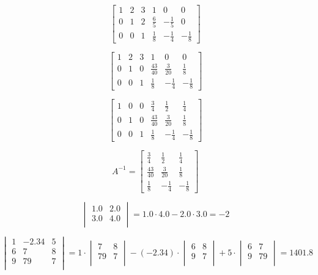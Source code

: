 \documentclass[a4paper, 14pt]{article}
\begin{document}
\[
\begin{bmatrix}
1 & 2 & 3 & 1 & 0 & 0 \\
0 & 1 & 2 & \frac{6}{5} & -\frac{1}{5} & 0 \\
0 & 0 & 1 & \frac{1}{8} & -\frac{1}{4} & -\frac{1}{8}
\end{bmatrix}
\]

\[
\begin{bmatrix}
1 & 2 & 3 & 1 & 0 & 0 \\
0 & 1 & 0 & \frac{43}{40} & \frac{3}{20} & \frac{1}{8} \\
0 & 0 & 1 & \frac{1}{8} & -\frac{1}{4} & -\frac{1}{8}
\end{bmatrix}
\]

\[
\begin{bmatrix}
1 & 0 & 0 & \frac{3}{4} & \frac{1}{2} & \frac{1}{4} \\
0 & 1 & 0 & \frac{43}{40} & \frac{3}{20} & \frac{1}{8} \\
0 & 0 & 1 & \frac{1}{8} & -\frac{1}{4} & -\frac{1}{8}
\end{bmatrix}
\]

\[
A^{-1} = \begin{bmatrix}
\frac{3}{4} & \frac{1}{2} & \frac{1}{4} \\
\frac{43}{40} & \frac{3}{20} & \frac{1}{8} \\
\frac{1}{8} & -\frac{1}{4} & -\frac{1}{8}
\end{bmatrix}
\]

\[
\begin{vmatrix}
1.0&2.0\\
3.0&4.0\\
\end{vmatrix}
=1.0\cdot 4.0 - 2.0\cdot 3.0=-2
\]



\[
\begin{vmatrix}
1&-2.34&5\\
6&7&8\\
9&79&7\\
\end{vmatrix}
=1\cdot \begin{vmatrix}
7&8\\
79&7\\
\end{vmatrix}
-(-2.34)\cdot \begin{vmatrix}
6&8\\
9&7\\
\end{vmatrix}
+5\cdot \begin{vmatrix}
6&7\\
9&79\\
\end{vmatrix}
=1401.8
\]
\end{document}
